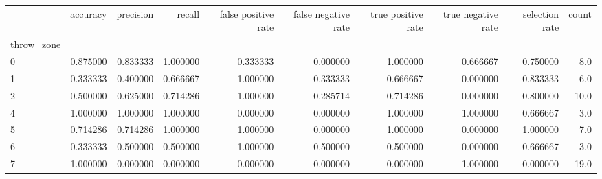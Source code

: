 \begin{tabular}{lrrrrrrrrr}
\toprule
{} &  accuracy &  precision &    recall &  false positive rate &  false negative rate &  true positive rate &  true negative rate &  selection rate &  count \\
throw\_zone &           &            &           &                      &                      &                     &                     &                 &        \\
\midrule
0          &  0.875000 &   0.833333 &  1.000000 &             0.333333 &             0.000000 &            1.000000 &            0.666667 &        0.750000 &    8.0 \\
1          &  0.333333 &   0.400000 &  0.666667 &             1.000000 &             0.333333 &            0.666667 &            0.000000 &        0.833333 &    6.0 \\
2          &  0.500000 &   0.625000 &  0.714286 &             1.000000 &             0.285714 &            0.714286 &            0.000000 &        0.800000 &   10.0 \\
4          &  1.000000 &   1.000000 &  1.000000 &             0.000000 &             0.000000 &            1.000000 &            1.000000 &        0.666667 &    3.0 \\
5          &  0.714286 &   0.714286 &  1.000000 &             1.000000 &             0.000000 &            1.000000 &            0.000000 &        1.000000 &    7.0 \\
6          &  0.333333 &   0.500000 &  0.500000 &             1.000000 &             0.500000 &            0.500000 &            0.000000 &        0.666667 &    3.0 \\
7          &  1.000000 &   0.000000 &  0.000000 &             0.000000 &             0.000000 &            0.000000 &            1.000000 &        0.000000 &   19.0 \\
\bottomrule
\end{tabular}
